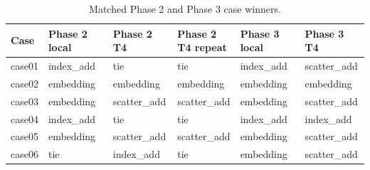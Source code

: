 \begin{table}[!htbp]
\centering
\fontsize{9}{11}\selectfont
\caption{Matched Phase 2 and Phase 3 case winners.}
\label{tab:phase3-phase2-case-join}
\setlength{\tabcolsep}{3pt}
\renewcommand{\arraystretch}{1.12}
\begin{tabular}{llllll}
\toprule
Case & Phase 2 local & Phase 2 T4 & \shortstack{Phase 2\\T4 repeat} & Phase 3 local & Phase 3 T4 \\
\midrule
case01 & index\_add & tie & tie & index\_add & scatter\_add \\
case02 & embedding & embedding & embedding & embedding & embedding \\
case03 & embedding & scatter\_add & scatter\_add & embedding & scatter\_add \\
case04 & index\_add & tie & tie & index\_add & index\_add \\
case05 & embedding & scatter\_add & scatter\_add & embedding & scatter\_add \\
case06 & tie & index\_add & tie & embedding & scatter\_add \\
\bottomrule
\end{tabular}
\end{table}